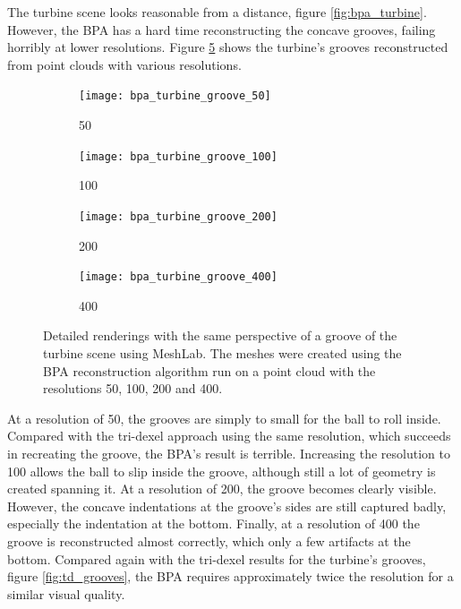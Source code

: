 The turbine scene looks reasonable from a distance, \cf figure \ref{fig:bpa_turbine}.
However, the BPA has a hard time reconstructing the concave grooves, failing horribly at lower resolutions.
Figure \ref{fig:bpa_grooves} shows the turbine's grooves reconstructed from point clouds with various resolutions.
%
\begin{figure}
	\centering
	\begin{subfigure}[b]{0.24\textwidth}
		\centering
		\texttt{[image: bpa\_turbine\_groove\_50]}
		\caption{50}
		\label{fig:bpa_turbine_groove_50}
	\end{subfigure}
	\begin{subfigure}[b]{0.24\textwidth}
		\centering
		\texttt{[image: bpa\_turbine\_groove\_100]}
		\caption{100}
		\label{fig:bpa_turbine_groove_100}
	\end{subfigure}
	\begin{subfigure}[b]{0.24\textwidth}
		\centering
		\texttt{[image: bpa\_turbine\_groove\_200]}
		\caption{200}
		\label{fig:bpa_turbine_groove_200}
	\end{subfigure}
	\begin{subfigure}[b]{0.24\textwidth}
		\centering
		\texttt{[image: bpa\_turbine\_groove\_400]}
		\caption{400}
		\label{fig:bpa_turbine_groove_400}
	\end{subfigure}
	\caption{
		Detailed renderings with the same perspective of a groove of the turbine scene using MeshLab.
		The meshes were created using the BPA reconstruction algorithm run on a point cloud with the resolutions 50, 100, 200 and 400.
	}
	\label{fig:bpa_grooves}
\end{figure}
%
At a resolution of 50, the grooves are simply to small for the ball to roll inside.
Compared with the tri-dexel approach using the same resolution, which succeeds in recreating the groove, the BPA's result is terrible.
Increasing the resolution to 100 allows the ball to slip inside the groove, although still a lot of geometry is created spanning it.
At a resolution of 200, the groove becomes clearly visible.
However, the concave indentations at the groove's sides are still captured badly, especially the indentation at the bottom.
Finally, at a resolution of 400 the groove is reconstructed almost correctly, which only a few artifacts at the bottom.
Compared again with the tri-dexel results for the turbine's grooves, \cf figure \ref{fig:td_grooves}, the BPA requires approximately twice the resolution for a similar visual quality.

